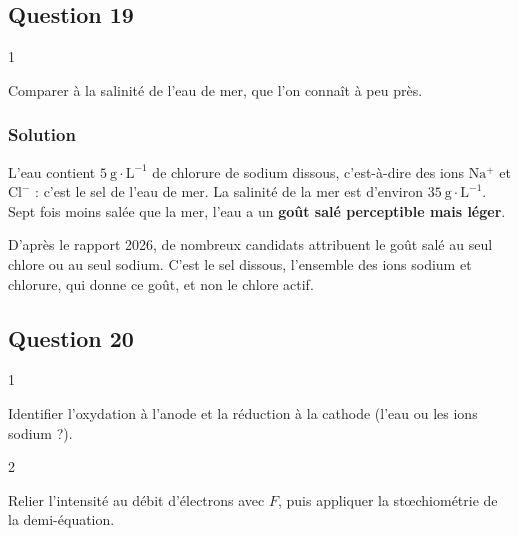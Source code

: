 \documentclass[11pt,a4paper]{article}
\begin{document}
\hypertarget{question-19}{%
\subsection{Question 19}\label{question-19}}

\begin{indication}{1}

Comparer à la salinité de l'eau de mer, que l'on connaît à peu près.

\end{indication}

\hypertarget{solution-18}{%
\subsubsection{Solution}\label{solution-18}}

L'eau contient \(5\ \mathrm{g\cdot L^{-1}}\) de chlorure de sodium dissous, c'est-à-dire des ions \(\mathrm{Na^+}\) et \(\mathrm{Cl^-}\) : c'est le sel de l'eau de mer. La salinité de la mer est d'environ \(35\ \mathrm{g\cdot L^{-1}}\). Sept fois moins salée que la mer, l'eau a un \textbf{goût salé perceptible mais léger}.

\begin{piege}

D'après le rapport 2026, de nombreux candidats attribuent le goût salé au seul chlore ou au seul sodium. C'est le sel dissous, l'ensemble des ions sodium et chlorure, qui donne ce goût, et non le chlore actif.

\end{piege}

\hypertarget{question-20}{%
\subsection{Question 20}\label{question-20}}

\begin{indication}{1}

Identifier l'oxydation à l'anode et la réduction à la cathode (l'eau ou les ions sodium ?).

\end{indication}

\begin{indication}{2}

Relier l'intensité au débit d'électrons avec \(F\), puis appliquer la stœchiométrie de la demi-équation.

\end{indication}
\end{document}
